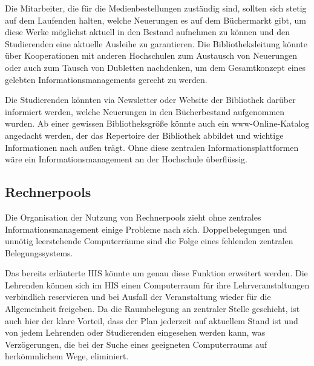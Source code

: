 Die Mitarbeiter, die für die Medienbestellungen zuständig sind, sollten sich stetig auf dem Laufenden halten, welche Neuerungen es auf dem Büchermarkt gibt, um diese Werke möglichst aktuell in den Bestand aufnehmen zu können und den Studierenden eine aktuelle Ausleihe zu garantieren. Die Bibliotheksleitung könnte über Kooperationen mit anderen Hochschulen zum Austausch von Neuerungen oder auch zum Tausch von Dubletten nachdenken, um dem Gesamtkonzept eines gelebten Informationsmanagements gerecht zu werden. 

Die Studierenden könnten via Newsletter oder Website der Bibliothek darüber informiert werden, welche Neuerungen in den Bücherbestand aufgenommen wurden. Ab einer gewissen Bibliotheksgröße könnte auch ein www-Online-Katalog angedacht werden, der das Repertoire der Bibliothek abbildet und wichtige Informationen nach außen trägt. Ohne diese zentralen Informationsplattformen wäre ein Informationsmanagement an der Hochschule überflüssig. 


\subsection{Rechnerpools}
Die Organisation der Nutzung von Rechnerpools zieht ohne zentrales Informationsmanagement einige Probleme nach sich. Doppelbelegungen und unnötig leerstehende Computerräume sind die Folge eines fehlenden zentralen Belegungssystems. 

Das bereits erläuterte HIS könnte um genau diese Funktion erweitert werden. Die Lehrenden können sich im HIS einen Computerraum für ihre Lehrveranstaltungen verbindlich reservieren und bei Ausfall der Veranstaltung wieder für die Allgemeinheit freigeben. Da die Raumbelegung an zentraler Stelle geschieht, ist auch hier der klare Vorteil, dass der Plan jederzeit auf aktuellem Stand ist und von jedem Lehrenden oder Studierenden eingesehen werden kann, was Verzögerungen, die bei der Suche eines geeigneten Computerraums auf herkömmlichem Wege, eliminiert. 
